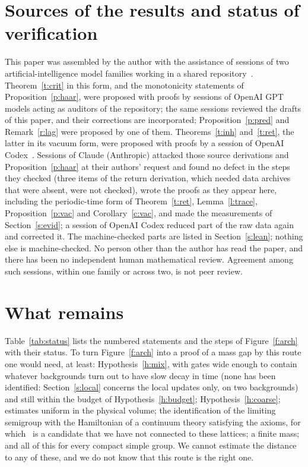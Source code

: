 \section{Sources of the results and status of verification}\label{s:disc}
This paper was assembled by the author with the assistance of sessions of two artificial-intelligence model
families working in a shared repository~\cite{Repo}. Theorem~\ref{t:crit} in this form, and the monotonicity
statements of Proposition~\ref{p:haar}, were proposed with proofs by sessions of OpenAI GPT models acting as
auditors of the repository; the same sessions reviewed the drafts of this paper, and their corrections
are incorporated; Proposition~\ref{p:pred} and Remark~\ref{r:lag} were proposed by one of them. Theorems~\ref{t:inh} and~\ref{t:ret}, the latter in its vacuum form, were proposed with
proofs by a session of OpenAI Codex~\cite{RepoInh,RepoRet}. Sessions of Claude (Anthropic) attacked those
source derivations and Proposition~\ref{p:haar} at their authors' request and found no defect in the steps
they checked (three items of the return derivation, which needed data archives that were absent, were not
checked), wrote the
proofs as they appear here, including the periodic-time form of Theorem~\ref{t:ret}, Lemma~\ref{l:trace}, Proposition~\ref{p:vac} and
Corollary~\ref{c:vac}, and made the measurements of Section~\ref{s:evid}; a session of OpenAI Codex reduced
part of the raw data again and corrected it. The machine-checked parts are listed in
Section~\ref{s:lean}; nothing else is machine-checked. No person other than the author has read the paper, and there has been no independent human
mathematical review. Agreement
among such sessions, within one family or across two, is not peer review.

\section{What remains}\label{s:rem}
Table~\ref{tab:status} lists the numbered statements and the steps of Figure~\ref{f:arch} with their status. To turn Figure~\ref{f:arch} into a proof of a
mass gap by this route one would need, at least: Hypothesis~\ref{h:mix}, with gates wide enough to contain
whatever backgrounds turn out to have slow decay in time (none has been identified: Section~\ref{s:local}
concerns the local updates only, on two backgrounds) and still within the budget of Hypothesis~\ref{h:budget};
Hypothesis~\ref{h:coarse}; estimates uniform in the physical volume; the identification of the limiting
semigroup with the Hamiltonian of a continuum theory satisfying the axioms, for which~\cite{OAI} is a
candidate that we have not connected to these lattices; a finite mass; and all of this for every compact
simple group. We cannot estimate the distance to any of these, and we do not know that this route is the
right one.

